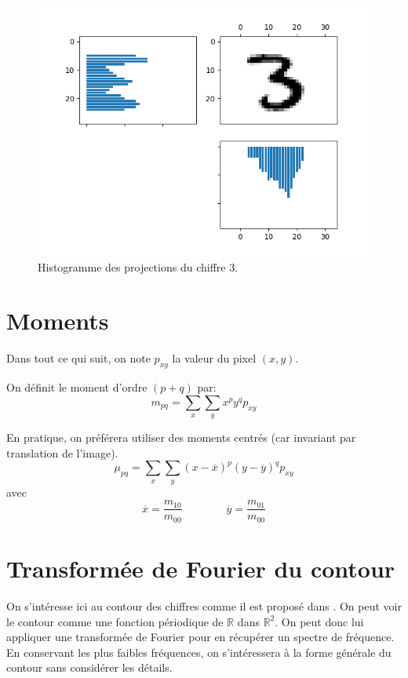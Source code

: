 \begin{figure}[h]
  \centering
  \includegraphics[scale=0.5]{assets/features-hvhisto-ex1}
  \caption{Histogramme des projections du chiffre 3.}
  \label{fig:features-hvhisto-ex1}
\end{figure}



\section{Moments}



Dans tout ce qui suit, on note $p_{xy}$ la valeur du pixel $(x,y)$.

On définit le moment d'ordre $(p+q)$ par:
\[
m_{pq} = \sum_x \sum_y x^p y^q p_{xy}
\]

En pratique, on préférera utiliser des moments centrés (car invariant 
par translation de l'image).
\[
\mu_{pq} = \sum_x \sum_y (x - \overline{x})^p (y - \overline{y})^q p_{xy}
\]
avec 
\[
\overline{x} = \frac{m_{10}}{m_{00}} \qquad \qquad \overline{y} = \frac{m_{01}}{m_{00}}
\]



\section{Transformée de Fourier du contour}

On s'intéresse ici au contour des chiffres comme il est proposé dans \cite{EllipticFourierFeatures}. 
On peut voir le contour comme une fonction périodique 
de $\mathbb{R}$ dans $\mathbb{R}^2$. 
On peut donc lui appliquer une transformée de Fourier pour 
en récupérer un spectre de fréquence. 
En conservant les plus faibles fréquences, on s'intéressera à 
la forme générale du contour sans considérer les détails.

